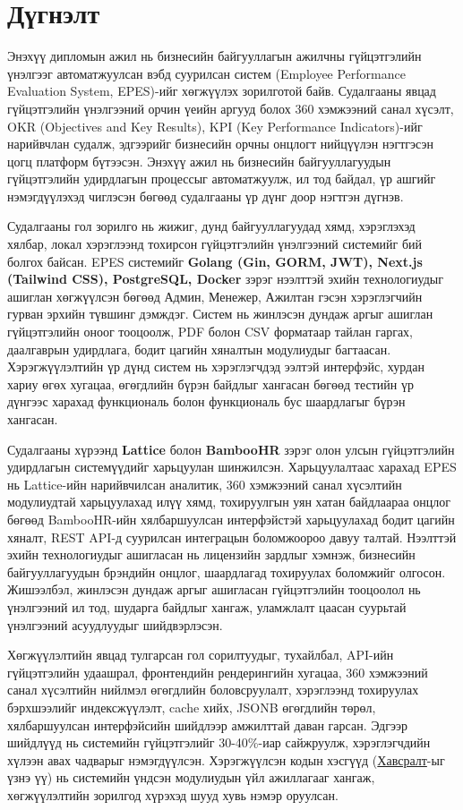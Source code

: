 \section{Дүгнэлт}
Энэхүү дипломын ажил нь бизнесийн байгууллагын ажилчны гүйцэтгэлийн үнэлгээг автоматжуулсан вэбд 
суурилсан систем (Employee Performance Evaluation System, EPES)-ийг хөгжүүлэх зорилготой байв. Судалгааны явцад гүйцэтгэлийн 
үнэлгээний орчин үеийн аргууд болох 360 хэмжээний санал хүсэлт, OKR (Objectives and Key Results), KPI (Key Performance Indicators)-ийг 
нарийвчлан судалж, эдгээрийг бизнесийн орчны онцлогт нийцүүлэн нэгтгэсэн цогц платформ бүтээсэн. Энэхүү ажил нь бизнесийн 
байгууллагуудын гүйцэтгэлийн удирдлагын процессыг автоматжуулж, ил тод байдал, үр ашгийг нэмэгдүүлэхэд чиглэсэн бөгөөд судалгааны үр дүнг доор нэгтгэн дүгнэв.

Судалгааны гол зорилго нь жижиг, дунд байгууллагуудад хямд, хэрэглэхэд хялбар, локал хэрэглээнд тохирсон гүйцэтгэлийн үнэлгээний 
системийг бий болгох байсан. EPES системийг \textbf{Golang (Gin, GORM, JWT), Next.js (Tailwind CSS), PostgreSQL, Docker} зэрэг нээлттэй 
эхийн технологиудыг ашиглан хөгжүүлсэн бөгөөд Админ, Менежер, Ажилтан гэсэн хэрэглэгчийн гурван эрхийн түвшинг дэмждэг. Систем нь жинлэсэн 
дундаж аргыг ашиглан гүйцэтгэлийн оноог тооцоолж, PDF болон CSV форматаар тайлан гаргах, даалгаврын удирдлага, бодит цагийн хяналтын модулиудыг 
багтаасан. Хэрэгжүүлэлтийн үр дүнд систем нь хэрэглэгчдэд ээлтэй интерфэйс, хурдан хариу өгөх хугацаа, өгөгдлийн бүрэн байдлыг хангасан бөгөөд 
тестийн үр дүнгээс харахад функциональ болон функциональ бус шаардлагыг бүрэн хангасан.

Судалгааны хүрээнд \textbf{Lattice} болон \textbf{BambooHR} зэрэг олон улсын гүйцэтгэлийн удирдлагын системүүдийг харьцуулан шинжилсэн. 
Харьцуулалтаас харахад EPES нь Lattice-ийн нарийвчилсан аналитик, 360 хэмжээний санал хүсэлтийн модулиудтай харьцуулахад илүү хямд, 
тохируулгын уян хатан байдлаараа онцлог бөгөөд BambooHR-ийн хялбаршуулсан интерфэйстэй харьцуулахад бодит цагийн хяналт, REST API-д 
суурилсан интеграцын боломжоороо давуу талтай. Нээлттэй эхийн технологиудыг ашигласан нь лицензийн зардлыг хэмнэж, бизнесийн 
байгууллагуудын брэндийн онцлог, шаардлагад тохируулах боломжийг олгосон. Жишээлбэл, жинлэсэн дундаж аргыг ашигласан гүйцэтгэлийн 
тооцоолол нь үнэлгээний ил тод, шударга байдлыг хангаж, уламжлалт цаасан суурьтай үнэлгээний асуудлуудыг шийдвэрлэсэн.

Хөгжүүлэлтийн явцад тулгарсан гол сорилтуудыг, тухайлбал, API-ийн гүйцэтгэлийн удаашрал, фронтендийн рендерингийн хугацаа, 360 хэмжээний 
санал хүсэлтийн нийлмэл өгөгдлийн боловсруулалт, хэрэглээнд тохируулах бэрхшээлийг индексжүүлэлт, cache хийх, JSONB өгөгдлийн төрөл, 
хялбаршуулсан интерфэйсийн шийдлээр амжилттай даван гарсан. Эдгээр шийдлүүд нь системийн гүйцэтгэлийг 30-40\%-иар сайжруулж, хэрэглэгчдийн 
хүлээн авах чадварыг нэмэгдүүлсэн. Хэрэгжүүлсэн кодын хэсгүүд (\hyperref[sec:appendix]{Хавсралт}-ыг үзнэ үү) нь системийн үндсэн модулиудын 
үйл ажиллагааг хангаж, хөгжүүлэлтийн зорилгод хүрэхэд шууд хувь нэмэр оруулсан.

